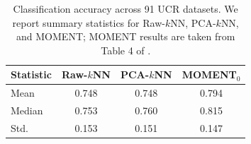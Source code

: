 \documentclass[12pt]{article}
\theoremstyle{definition}
\begin{document}
\begin{table}
  \caption{Classification accuracy across 91 UCR datasets. We report summary statistics for Raw-$k$NN, PCA-$k$NN, and MOMENT; MOMENT results are taken from Table 4 of \cite{goswami2024moment}.}
  \label{tab:classification_results}
  \centering
  \small
  \begin{tabular}{@{}lccc@{}}
    \toprule
    Statistic & Raw-$k$NN & PCA-$k$NN & MOMENT$_0$ \\
    \midrule
    Mean   & 0.748 & 0.748 & 0.794 \\
    Median & 0.753 & 0.760 & 0.815 \\
    Std.   & 0.153 & 0.151 & 0.147 \\
    \bottomrule
  \end{tabular}
\end{table}


\end{document}
